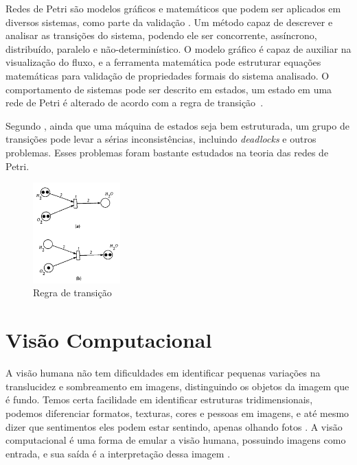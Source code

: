 Redes de Petri são modelos gráficos e matemáticos que podem ser aplicados em diversos sistemas, como parte da validação . Um método capaz de descrever e analisar as transições do sistema, podendo ele ser concorrente, assíncrono, distribuído, paralelo e não-determinístico. O modelo gráfico é capaz de auxiliar na visualização do fluxo, e a ferramenta matemática pode estruturar equações matemáticas para validação de propriedades formais do sistema analisado. O comportamento de sistemas pode ser descrito em estados, um estado em uma rede de Petri é alterado de acordo com a regra de transição~\cite{murata:1989}.


Segundo , ainda que uma máquina de estados seja bem estruturada, um grupo de transições pode levar a sérias inconsistências, incluindo \textit{deadlocks} e outros problemas. Esses problemas foram bastante estudados na teoria das redes de Petri. 

 \begin{figure}[H]
	\centering
    	\caption{\label{fig:petri}Regra de transição}
		\includegraphics[width = 0.3\textwidth]	{resources/petri}
\end{figure}


\section{Visão Computacional}

A visão humana não tem dificuldades em identificar pequenas variações na translucidez e sombreamento em imagens, distinguindo os objetos da imagem que é fundo. Temos certa facilidade em identificar estruturas tridimensionais, podemos diferenciar formatos, texturas, cores e pessoas em imagens, e até mesmo dizer que sentimentos eles podem estar sentindo, apenas olhando fotos \cite{szeliski2010computer}.
% 
A visão computacional é uma forma de emular a visão humana, possuindo imagens como entrada, e sua saída é a interpretação dessa imagem \cite{marengoni:2009}.

